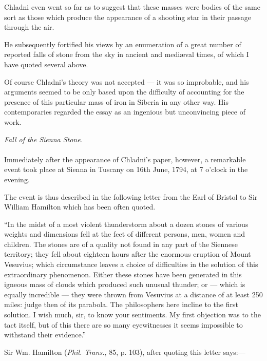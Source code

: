 \documentclass[a4paper, 11pt, oneside]{article}
\begin{document}
Chladni even went so far as to suggest that these masses were bodies of the same sort as those which produce the appearance of a shooting star in their passage through the air. 

He subsequently fortified his views by an enumeration of a great number of reported falls of stone from the sky in ancient and mediæval times, of which I have quoted several above. 

Of course Chladni's theory was not accepted --- it was so improbable, and his arguments seemed to be only based upon the difficulty of accounting for the presence of this particular mass of iron in Siberia in any other way. His contemporaries regarded the essay as an ingenious but unconvincing piece of work. 
\begin{center}
\emph{Fall of the Sienna Stone.}
\end{center}
\paragraph{}
Immediately after the appearance of Chladni's paper, however, a remarkable event took place at Sienna in Tuscany on 16th June, 1794, at 7 o'clock in the evening. 

The event is thus described in the following letter from the Earl of Bristol to Sir William Hamilton which has been often quoted. 

``In the midst of a most violent thunderstorm about a dozen stones of various weights and dimensions fell at the feet of different persons, men, women and children. The stones are of a quality not found in any part of the Siennese territory; they fell about eighteen hours after the enormous eruption of Mount Vesuvius; which circumstance leaves a choice of difficulties in the solution of this extraordinary phenomenon. Either these stones have been generated in this igneous mass of clouds which produced such unusual thunder; or --- which is equally incredible --- they were thrown from Vesuvius at a distance of at least 250 miles: judge then of its parabola. The philosophers here incline to the first solution. I wish much, sir, to know your sentiments. My first objection was to the tact itself, but of this there are so many eyewitnesses it seems impossible to withstand their evidence.'' 
\begin{center}
Sir Wm. Hamilton (\emph{Phil. Trans.}, 85, p. 103), after quoting this letter says:--- 
\end{center}
\end{document}
